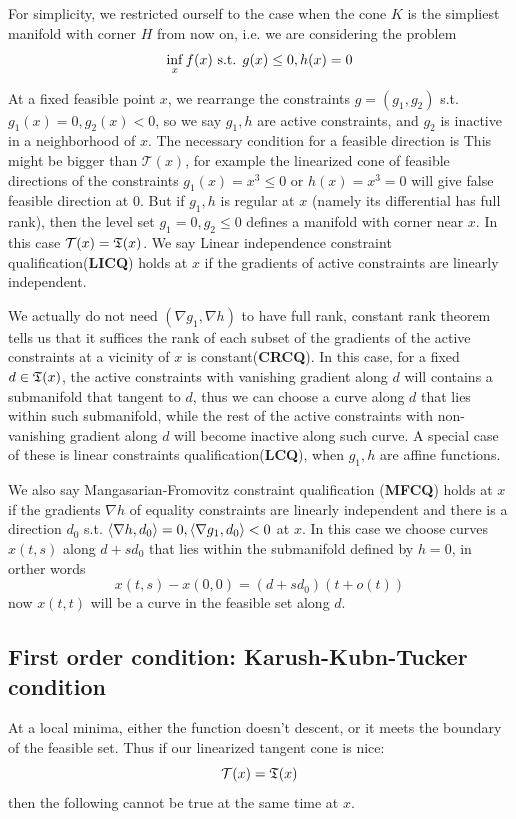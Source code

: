 \documentclass[a4paper]{mynotes}
\begin{document}
 For simplicity, we restricted ourself to the case when the cone $K$ is the simpliest manifold with corner $H$ from now on, i.e. we are considering the problem $$\inf_x f(x) \text{ s.t. } g(x)\le 0, h(x)=0$$

 At a fixed feasible point $x$, we rearrange the constraints $g=(g_1,g_2)$   s.t. $g_1(x)=0,g_2(x)< 0$, so we say $g_1,h$ are active constraints, and $g_2$ is inactive in a neighborhood of $x$. The necessary condition for a feasible direction is 
This might be bigger than $\mathcal T(x)$, for example the linearized cone of feasible directions of the constraints $g_1(x)=x^3\le 0$ or $h(x)=x^3=0$ will give false feasible direction at $0$. But if $g_1,h$ is regular at $x$ (namely its differential has full rank), then the level set $g_1=0,g_2\leq 0$ defines a manifold with corner near $x$. In this case $\mathcal{T}(x)=\mathfrak{T}(x)$. We say Linear independence constraint qualification(\textbf{LICQ}) holds at $x$ if the gradients of active constraints are linearly independent. 

We actually do not need $(\nabla g_1,\nabla h)$ to have full rank, constant rank theorem tells us that it suffices the rank of each subset of the gradients of the active constraints at a vicinity of 
$x$ is constant(\textbf{CRCQ}). In this case, for a fixed $d\in\mathfrak{T}(x)$, the active constraints with vanishing gradient along $d$ will contains a submanifold that tangent to $d$, thus we can choose a curve along $d$ that lies within such submanifold, while the rest of the active constraints with non-vanishing gradient along $d$ will become inactive along such curve. A special case of these is linear constraints qualification(\textbf{LCQ}), when $g_1,h$ are affine functions.

We also say Mangasarian-Fromovitz constraint qualification (\textbf{MFCQ}) holds at $x$ if the gradients $\nabla h$ of equality constraints are linearly independent and there is a direction $d_0$ s.t. $\left\langle\nabla h,d_0\right\rangle=0,\left\langle\nabla g_1,d_0\right\rangle< 0$ at $x$. In this case we choose curves  $x(t,s)$ along $d+s d_0$ that lies within the submanifold defined by $h=0$, in orther words $$x(t,s)-x(0,0)=(d+s d_0)(t+o(t))$$now $x(t,t)$ will be a curve in the feasible set along $d$. 


\subsection{First order condition: Karush-Kubn-Tucker condition}
At a local minima, either the function doesn't descent, or it meets the boundary of the feasible set. Thus if our linearized tangent cone is nice: $$\mathcal T(x)=\mathfrak{T}(x)$$ then the following  cannot be true at the same time at $x$.
\end{document}
